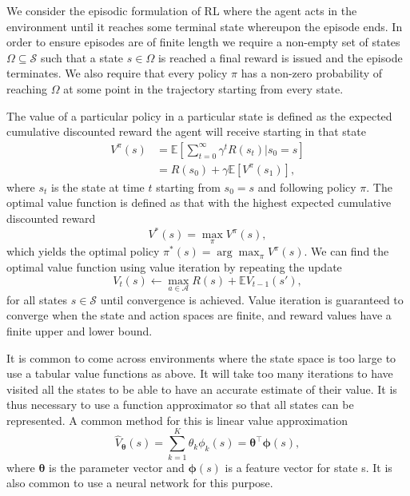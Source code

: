We consider the episodic formulation of RL where the agent acts in the environment until it reaches some terminal state whereupon the episode ends.
In order to ensure episodes are of finite length we require a non-empty set of states $\Omega \subseteq \mathcal{S}$ such that a state $s \in \Omega$ is reached a final reward is issued and the episode terminates.
We also require that every policy $\pi$ has a non-zero probability of reaching $\Omega$ at some point in the trajectory starting from every state.


The value of a particular policy in a particular state is defined as the  expected cumulative discounted reward the agent will receive starting in that state
\begin{align*}
        V^\pi(s) &= \mathbb{E} [ \sum_{t=0}^\infty \gamma^t R(s_t)|s_0=s] \\
        &= R(s_0) + \gamma \mathbb{E} [V^\pi(s_1)],
\end{align*}
where $s_t$ is the state at time $t$ starting from $s_0=s$ and following policy $\pi$. The optimal value function is defined as that with the highest expected cumulative discounted reward 
\begin{equation*}
    V^*(s) = \max_\pi V^\pi(s),
\end{equation*}
which yields the optimal policy $\pi^*(s) = \arg \max_\pi V^\pi(s)$. 
We can find the optimal value function using value iteration by repeating the update
\begin{equation*}
    V_t(s) \leftarrow \max_{a \in \mathcal{A}} R(s) + \mathbb{E} V_{t-1}(s'),
\end{equation*}
for all states $s \in \mathcal{S}$ until convergence is achieved.
Value iteration is guaranteed to converge when the state and action spaces are finite, and reward values have a finite upper and lower bound.

It is common to come across environments where the state space is too large to use a tabular value functions as above. It will take too many iterations to have visited all the states to be able to have an accurate estimate of their value. It is thus necessary to use a function approximator so that all states can be represented. A common method for this is linear value approximation
\begin{equation*}
    \hat{V}_{\boldsymbol{\theta}}(s) = \sum_{k=1}^K \theta_k \phi_k(s) = \boldsymbol{\theta}^\top \boldsymbol{\phi}(s),
\end{equation*}
where $\boldsymbol{\theta}$ is the parameter vector and $\boldsymbol{\phi}(s)$ is a feature vector for state s. It is also common to use a neural network for this purpose.

